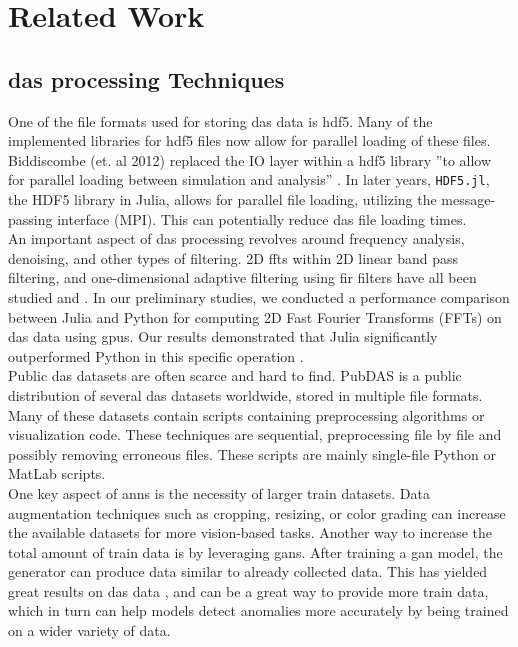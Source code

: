\section{Related Work}
\label{relwork:anomaly}


\subsection{\acrshort{das} processing Techniques}

One of the file formats used for storing \acrshort{das} data is \acrshort{hdf5}. Many of the implemented libraries for \acrshort{hdf5} files now allow for parallel loading of these files. Biddiscombe (et. al 2012) replaced the IO layer within a \acrshort{hdf5} library ''to allow for parallel loading between simulation and analysis'' \cite{biddiscombe2012parallel}. In later years, \texttt{HDF5.jl}, the HDF5 library in Julia, allows for parallel file loading, utilizing the message-passing interface (MPI). This can potentially reduce \acrshort{das} file loading times. \\ 

An important aspect of \acrshort{das} processing revolves around frequency analysis, denoising, and other types of filtering. 2D \acrfull{fft}s within 2D linear band pass filtering, and one-dimensional adaptive filtering using \acrfull{fir} filters have all been studied and \cite{daspreproc}. In our preliminary studies, we conducted a performance comparison between Julia and Python for computing 2D Fast Fourier Transforms (FFTs) on \acrshort{das} data using \acrshort{gpu}s. Our results demonstrated that Julia significantly outperformed Python in this specific operation \cite{projthesis}. \\

Public \acrshort{das} datasets are often scarce and hard to find. PubDAS \cite{spica2023pubdas} is a public distribution of several \acrshort{das} datasets worldwide, stored in multiple file formats. Many of these datasets contain scripts containing preprocessing algorithms or visualization code. These techniques are sequential, preprocessing file by file and possibly removing erroneous files. These scripts are mainly single-file Python or MatLab scripts. \\ 

One key aspect of \acrshort{ann}s is the necessity of larger train datasets. Data augmentation techniques such as cropping, resizing, or color grading can increase the available datasets for more vision-based tasks. Another way to increase the total amount of train data is by leveraging \acrshort{gan}s. After training a \acrshort{gan} model, the generator can produce data similar to already collected data. This has yielded great results on \acrshort{das} data \cite{Shiloh:19}, and can be a great way to provide more train data, which in turn can help models detect anomalies more accurately by being trained on a wider variety of data. \\


